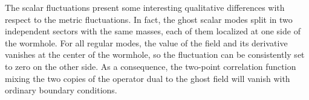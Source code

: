 The scalar fluctuations present some interesting qualitative differences with respect to the metric fluctuations. In fact, the ghost scalar modes split in two independent sectors with the same masses, each of them localized at one side of the wormhole. For all regular modes, the value of the field and its derivative vanishes at the center of the wormhole, so the fluctuation can be consistently set to zero on the other side. As a consequence, the two-point correlation function mixing the two copies of the operator dual to the ghost field will vanish with ordinary boundary conditions.

